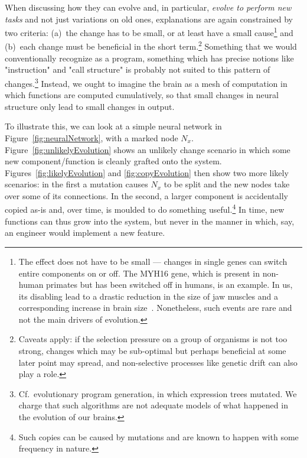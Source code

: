 When discussing how they can evolve and, in particular, {\em evolve to perform new tasks} and not just variations on old ones, explanations are again constrained by two criteria: (a)~the change has to be small, or at least have a small cause\footnote{The effect does not have to be small --- changes in single genes can switch entire components on or off. The MYH16 gene, which is present in non-human primates but has been switched off in humans, is an example. In us, its disabling lead to a drastic reduction in the size of jaw muscles and a corresponding increase in brain size~\cite{carroll2005}. Nonetheless, such events are rare and not the main drivers of evolution.} and (b)~each change must be beneficial in the short term.\footnote{Caveats apply: if the selection pressure on a group of organisms is not too strong, changes which may be sub-optimal but perhaps beneficial at some later point may spread, and non-selective processes like genetic drift can also play a role.} Something that we would conventionally recognize as a program, something which has precise notions like "instruction" and "call structure" is probably not suited to this pattern of changes.\footnote{Cf.\ evolutionary program generation, in which expression trees mutated. We charge that such algorithms are not adequate models of what happened in the evolution of our brains.} Instead, we ought to imagine the brain as a mesh of computation in which functions are computed cumulatively, so that small changes in neural structure only lead to small changes in output.

To illustrate this, we can look at a simple neural network in Figure~\ref{fig:neuralNetwork}, with a marked node $N_x$. Figure~\ref{fig:unlikelyEvolution} shows an unlikely change scenario in which some new component/function is cleanly grafted onto the system. Figures~\ref{fig:likelyEvolution} and \ref{fig:copyEvolution} then show two more likely scenarios: in the first a mutation causes $N_x$ to be split and the new nodes take over some of its connections. In the second, a larger component is accidentally copied as-is and, over time, is moulded to do something useful.\footnote{Such copies can be caused by mutations and are known to happen with some frequency in nature.} In time, new functions can thus grow into the system, but never in the manner in which, say, an engineer would implement a new feature. 

